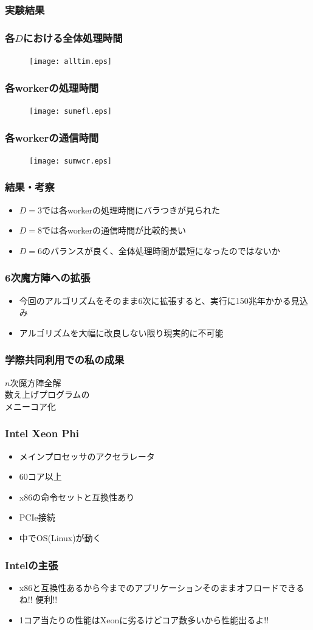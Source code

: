 \documentclass[dvipdfmx,20pt,notheorems,t]{beamer}
\begin{document}
\begin{frame}\frametitle{実験結果}
\end{frame}

\begin{frame}\frametitle{各$D$における全体処理時間}
\begin{figure}[htb]
\centering
\texttt{[image: alltim.eps]}
\end{figure}
\end{frame}

\begin{frame}\frametitle{各workerの処理時間}
\begin{figure}[htb]
\centering
\texttt{[image: sumefl.eps]}
\end{figure}
\end{frame}

\begin{frame}\frametitle{各workerの通信時間}
\begin{figure}[htb]
\centering
\texttt{[image: sumwcr.eps]}
\end{figure}
\end{frame}

\begin{frame}\frametitle{結果・考察}
\begin{itemize}
\item $D=3$では各workerの処理時間にバラつきが見られた
\item $D=8$では各workerの通信時間が比較的長い
\item $D=6$のバランスが良く、全体処理時間が最短になったのではないか
\end{itemize}
\end{frame}

\begin{frame}\frametitle{6次魔方陣への拡張}
\begin{itemize}
\item 今回のアルゴリズムをそのまま6次に拡張すると、実行に150兆年かかる見込み
\item アルゴリズムを大幅に改良しない限り現実的に不可能
\end{itemize}
\end{frame}

\begin{frame}\frametitle{学際共同利用での私の成果}
\centering
\large
$n$次魔方陣全解 \\
数え上げプログラムの \\
メニーコア化
\end{frame}

\begin{frame}\frametitle{Intel Xeon Phi}
\begin{itemize}
\item メインプロセッサのアクセラレータ
\item 60コア以上
\item x86の命令セットと互換性あり
\item PCIe接続
\item 中でOS(Linux)が動く
\end{itemize}
\end{frame}

\begin{frame}\frametitle{Intelの主張}
\begin{itemize}
\item x86と互換性あるから今までのアプリケーションそのままオフロードできるね!! 便利!!
\item 1コア当たりの性能はXeonに劣るけどコア数多いから性能出るよ!!
\end{itemize}
\end{frame}
\end{document}
